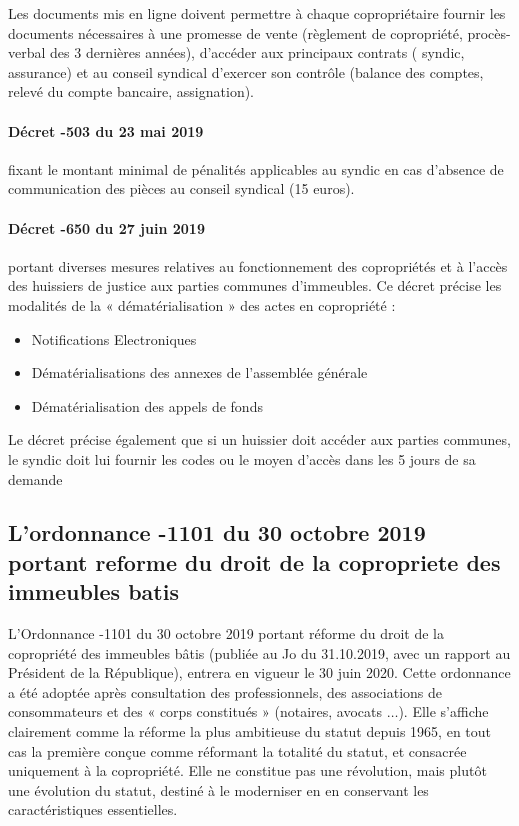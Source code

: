 			Les documents mis en ligne doivent permettre à chaque copropriétaire fournir les documents nécessaires à une promesse de vente (règlement de copropriété, procès-verbal des 3 dernières années), d’accéder aux principaux contrats ( syndic, assurance) et au conseil syndical d’exercer son contrôle (balance des comptes, relevé du compte bancaire, assignation).
			
			\paragraph{Décret -503 du 23 mai 2019} fixant le montant minimal de pénalités applicables au syndic en cas d’absence de communication des pièces au conseil syndical (15 euros).
			
			\paragraph{Décret -650 du 27 juin 2019} portant diverses mesures relatives au fonctionnement des copropriétés et à l'accès des huissiers de justice aux parties communes d'immeubles.
			Ce décret précise les modalités de la « dématérialisation » des actes en copropriété :
			\begin{itemize}
				\item Notifications Electroniques
				\item Dématérialisations des annexes de l’assemblée générale
				\item Dématérialisation des appels de fonds
			\end{itemize}
			Le décret précise également que si un huissier doit accéder aux parties communes, le syndic doit lui fournir les codes ou le moyen d’accès dans les 5 jours de sa demande
		
		\subsection{L’ordonnance -1101 du 30 octobre 2019 portant reforme du droit de la copropriete des immeubles batis}
			L’Ordonnance -1101 du 30 octobre 2019 portant réforme du droit de la copropriété des immeubles bâtis (publiée au Jo du 31.10.2019, avec un rapport au Président de la République), entrera en vigueur le 30 juin 2020.
			Cette ordonnance a été adoptée après consultation des professionnels, des associations de consommateurs et des « corps constitués » (notaires, avocats $\dots$).
			Elle s’affiche clairement comme la réforme la plus ambitieuse du statut depuis 1965, en tout cas la première conçue comme réformant la totalité du statut, et consacrée uniquement à la copropriété.
			Elle ne constitue pas une révolution, mais plutôt une évolution du statut, destiné à le moderniser en en conservant les caractéristiques essentielles.

